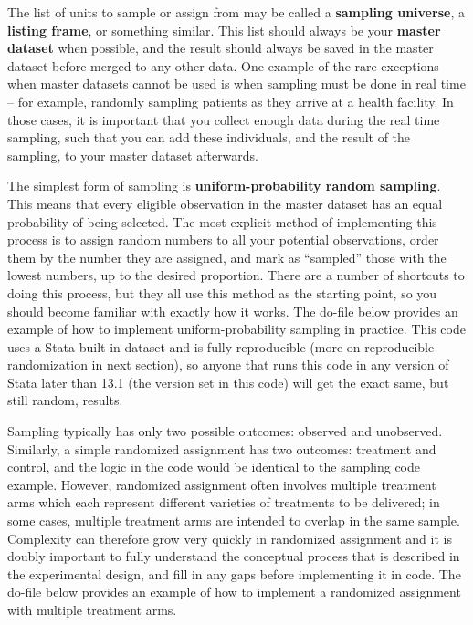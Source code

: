 The list of units to sample or assign from may be called a \textbf{sampling universe},
a \textbf{listing frame}, or something similar.
This list should always be your \textbf{master dataset} when possible,
and the result should always be saved in the master dataset
before merged to any other data.
One example of the rare exceptions
when master datasets cannot be used is
when sampling must be done in real time --
for example, randomly sampling patients
as they arrive at a health facility.
In those cases,
it is important that you collect enough data
during the real time sampling,
such that you can add these individuals,
and the result of the sampling,
to your master dataset afterwards.

The simplest form of sampling is
\textbf{uniform-probability random sampling}.
This means that every eligible observation in the master dataset
has an equal probability of being selected.
The most explicit method of implementing this process
is to assign random numbers to all your potential observations,
order them by the number they are assigned,
and mark as ``sampled'' those with the lowest numbers, up to the desired proportion.
There are a number of shortcuts to doing this process,
but they all use this method as the starting point,
so you should become familiar with exactly how it works.
The do-file below provides an example of
how to implement uniform-probability sampling in practice.
This code uses a Stata built-in dataset and is fully reproducible
(more on reproducible randomization in next section),
so anyone that runs this code in any version of Stata later than 13.1
(the version set in this code)
will get the exact same, but still random, results.


Sampling typically has only two possible outcomes: observed and unobserved.
Similarly, a simple randomized assignment has two outcomes: treatment and control,
and the logic in the code would be identical to the sampling code example.
However, randomized assignment often involves multiple treatment arms
which each represent different varieties of treatments to be delivered;
in some cases, multiple treatment arms are intended to overlap in the same sample.
Complexity can therefore grow very quickly in randomized assignment
and it is doubly important to fully understand the conceptual process
that is described in the experimental design,
and fill in any gaps before implementing it in code.
The do-file below provides an example of how to implement
a randomized assignment with multiple treatment arms.

